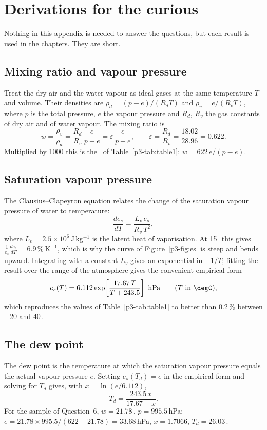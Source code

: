 \section{Derivations for the curious}\label{p3-app:derivations}

Nothing in this appendix is needed to answer the questions, but each result is used in the chapters. They are short.

\subsection{Mixing ratio and vapour pressure}

Treat the dry air and the water vapour as ideal gases at the same temperature $T$ and volume. Their densities are $\rho_d=(p-e)/(R_dT)$ and $\rho_v=e/(R_vT)$, where $p$ is the total pressure, $e$ the vapour pressure and $R_d$, $R_v$ the gas constants of dry air and of water vapour. The mixing ratio is
\[
w=\frac{\rho_v}{\rho_d}=\frac{R_d}{R_v}\,\frac{e}{p-e}=\varepsilon\,\frac{e}{p-e},\qquad \varepsilon=\frac{R_d}{R_v}=\frac{18.02}{28.96}=0.622 .
\]
Multiplied by 1000 this is the \gkg\ of Table~\ref{p3-tab:table1}: $w=622\,e/(p-e)$.

\subsection{Saturation vapour pressure}

The Clausius--Clapeyron equation relates the change of the saturation vapour pressure of water to temperature:
\[
\frac{d e_s}{dT}=\frac{L_v\,e_s}{R_v\,T^{2}},
\]
where $L_v=2.5\times10^{6}$\,J\,kg$^{-1}$ is the latent heat of vaporisation. At 15\,\degC\ this gives $\frac{1}{e_s}\frac{de_s}{dT}=6.9\,\%\ \mathrm{K^{-1}}$, which is why the curve of Figure~\ref{p3-fig:es} is steep and bends upward. Integrating with a constant $L_v$ gives an exponential in $-1/T$; fitting the result over the range of the atmosphere gives the convenient empirical form
\[
e_s(T)=6.112\exp\!\left[\frac{17.67\,T}{T+243.5}\right]\ \mathrm{hPa}\qquad (T\ \text{in }\degC),
\]
which reproduces the values of Table~\ref{p3-tab:table1} to better than 0.2\,\% between $-20$ and 40\,\degC.

\subsection{The dew point}

The dew point is the temperature at which the saturation vapour pressure equals the actual vapour pressure $e$. Setting $e_s(T_d)=e$ in the empirical form and solving for $T_d$ gives, with $x=\ln(e/6.112)$,
\[
T_d=\frac{243.5\,x}{17.67-x}.
\]
For the sample of Question~6, $w=21.78$\,\gkg, $p=995.5$\,hPa: $e=21.78\times995.5/(622+21.78)=33.68$\,hPa, $x=1.7066$, $T_d=26.03$\,\degC.


